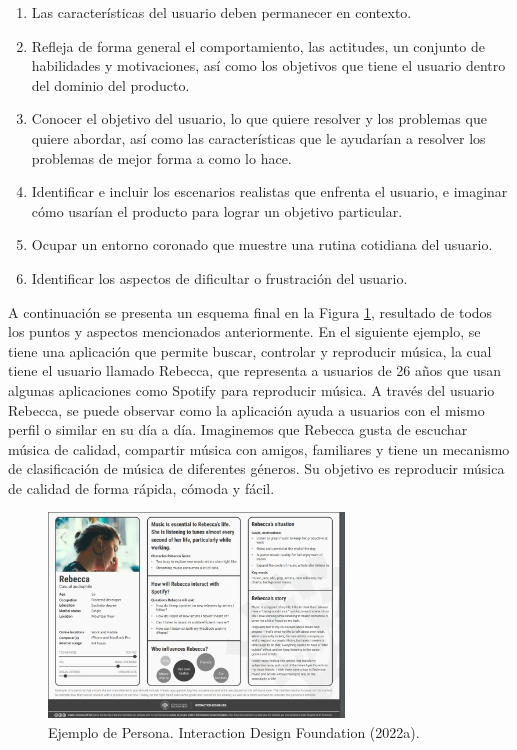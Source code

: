 \begin{enumerate}
  \item Las características del usuario deben permanecer en contexto.
  \item Refleja de forma general el comportamiento, las actitudes, un conjunto de habilidades y motivaciones, así como los objetivos que tiene el usuario dentro del dominio del producto.
  \item Conocer el objetivo del usuario, lo que quiere resolver y los problemas que quiere abordar, así como las características que le ayudarían a resolver los problemas de mejor forma a como lo hace.
  \item Identificar e incluir los escenarios realistas que enfrenta el usuario, e imaginar cómo usarían el producto para lograr un objetivo particular.
  \item Ocupar un entorno coronado que muestre una rutina cotidiana del usuario.
  \item Identificar los aspectos de dificultar o frustración del usuario.
\end{enumerate}

A continuación se presenta un esquema final en la Figura \ref{fig:34}, resultado de todos los puntos y aspectos mencionados anteriormente. En el siguiente ejemplo, se tiene una aplicación que permite buscar, controlar y reproducir música, la cual tiene el usuario llamado Rebecca, que representa a usuarios de 26 años que usan algunas aplicaciones como Spotify para reproducir música. A través del usuario Rebecca, se puede observar como la aplicación ayuda a usuarios con el mismo perfil o similar en su día a día. Imaginemos que Rebecca gusta de escuchar música de calidad, compartir música con amigos, familiares y tiene un mecanismo de clasificación de música de diferentes géneros. Su objetivo es reproducir música de calidad de forma rápida, cómoda y fácil.

\begin{figure}[H]
  \centering
  \includegraphics[width=0.70\textwidth]{Cap3/Figuras/EjemploPersona.jpg}
  \caption{Ejemplo de Persona. Interaction Design Foundation (2022a).}
  \label{fig:34}
\end{figure}

